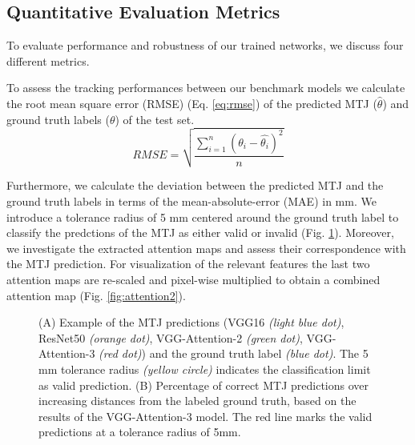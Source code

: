\documentclass[letterpaper, 10 pt, conference]{ieeeconf}
\begin{document}
\subsection{Quantitative Evaluation Metrics}
To evaluate performance and robustness of our trained networks, we discuss four different metrics.

To assess the tracking performances between our benchmark models we calculate the root mean square error (RMSE) (Eq. \ref{eq:rmse}) of the predicted MTJ ($\hat{\theta}$) and ground truth labels ($\theta$) of the test set.
\begin{equation}
\label{eq:rmse}
    RMSE = \sqrt{\dfrac{\sum_{i=1}^{n} (\theta_i-\hat{\theta_i})^2}{n}}
\end{equation}

Furthermore, we calculate the deviation between the predicted MTJ and the ground truth labels in terms of the mean-absolute-error (MAE) in mm. We introduce a tolerance radius of 5 mm centered around the ground truth label to classify the predctions of the MTJ as either valid or invalid (Fig. \ref{fig:tolerance}).
Moreover, we investigate the extracted attention maps and assess their correspondence with the MTJ prediction. For visualization of the relevant features the last two attention maps are re-scaled and  pixel-wise multiplied to obtain a combined attention map (Fig. \ref{fig:attention2}).
\begin{figure}[thpb]
    \centering
    \caption{(A) Example of the MTJ predictions (VGG16 \textit{(light blue dot)}, ResNet50 \textit{(orange dot)}, VGG-Attention-2 \textit{(green dot)}, VGG-Attention-3 \textit{(red dot)}) and the ground truth label \textit{(blue dot)}. The 5 mm tolerance radius \textit{(yellow circle)} indicates the classification limit as valid prediction. (B) Percentage of correct MTJ predictions over increasing distances from the labeled ground truth, based on the results of the VGG-Attention-3 model. The red line marks the valid predictions at a tolerance radius of 5mm.}
    \label{fig:tolerance}
\end{figure}
\begin{figure*}[thpb]
   \centering
    \caption{Results of test sample 1 (TS 1) in the upper row and test sample 2 (TS 2) in the lower row calculated with the VGG-Attention-3 model: (A) MTJ prediction \textit{(red dot)} and ground truth \textit{(blue dot)} (B) Overlay of attention map with original image (C) Combined attention map. TS 1 shows that the attention module neglects distortions in the image.}
    \label{fig:attention2}
\end{figure*}
\end{document}
